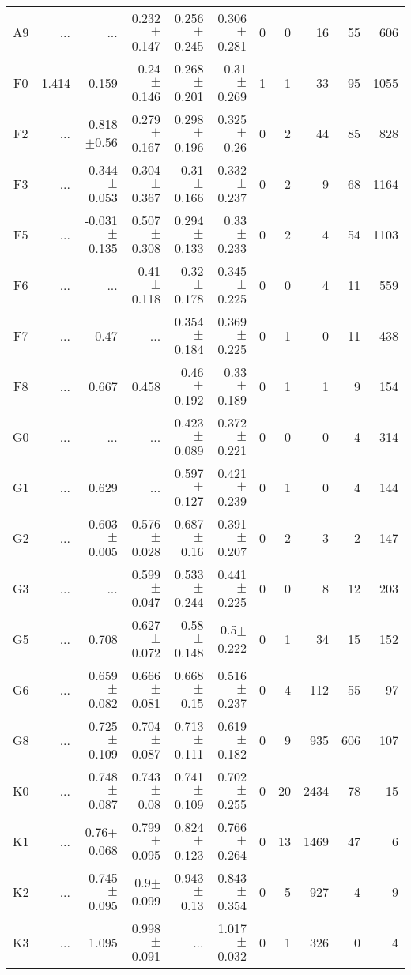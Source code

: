 \begin{table}[t]
\begin{table}[t]
\begin{center}
\begin{tabular}{c|rrrrr|rrrrr}
    A9	&	 ...	&	 ...	&	0.232$\pm$0.147	&	0.256$\pm$0.245	&	0.306$\pm$0.281	&	0	&	0	&	16	&	55	&	606	\\
    F0	&	1.414	&	0.159	&	0.24$\pm$0.146	&	0.268$\pm$0.201	&	0.31$\pm$0.269	&	1	&	1	&	33	&	95	&	1055	\\
    F2	&	 ...	&	0.818$\pm$0.56	&	0.279$\pm$0.167	&	0.298$\pm$0.196	&	0.325$\pm$0.26	&	0	&	2	&	44	&	85	&	828	\\
    F3	&	 ...	&	0.344$\pm$0.053	&	0.304$\pm$0.367	&	0.31$\pm$0.166	&	0.332$\pm$0.237	&	0	&	2	&	9	&	68	&	1164	\\
    F5	&	 ...	&	-0.031$\pm$0.135	&	0.507$\pm$0.308	&	0.294$\pm$0.133	&	0.33$\pm$0.233	&	0	&	2	&	4	&	54	&	1103	\\
    F6	&	 ...	&	 ...	&	0.41$\pm$0.118	&	0.32$\pm$0.178	&	0.345$\pm$0.225	&	0	&	0	&	4	&	11	&	559	\\
    F7	&	 ...	&	0.47	&	 ...	&	0.354$\pm$0.184	&	0.369$\pm$0.225	&	0	&	1	&	0	&	11	&	438	\\
    F8	&	 ...	&	0.667	&	0.458	&	0.46$\pm$0.192	&	0.33$\pm$0.189	&	0	&	1	&	1	&	9	&	154	\\
    G0	&	 ...	&	 ...	&	 ...	&	0.423$\pm$0.089	&	0.372$\pm$0.221	&	0	&	0	&	0	&	4	&	314	\\
    G1	&	 ...	&	0.629	&	 ...	&	0.597$\pm$0.127	&	0.421$\pm$0.239	&	0	&	1	&	0	&	4	&	144	\\
    G2	&	 ...	&	0.603$\pm$0.005	&	0.576$\pm$0.028	&	0.687$\pm$0.16	&	0.391$\pm$0.207	&	0	&	2	&	3	&	2	&	147	\\
    G3	&	 ...	&	 ...	&	0.599$\pm$0.047	&	0.533$\pm$0.244	&	0.441$\pm$0.225	&	0	&	0	&	8	&	12	&	203	\\
    G5	&	 ...	&	0.708	&	0.627$\pm$0.072	&	0.58$\pm$0.148	&	0.5$\pm$0.222	&	0	&	1	&	34	&	15	&	152	\\
    G6	&	 ...	&	0.659$\pm$0.082	&	0.666$\pm$0.081	&	0.668$\pm$0.15	&	0.516$\pm$0.237	&	0	&	4	&	112	&	55	&	97	\\
    G8	&	 ...	&	0.725$\pm$0.109	&	0.704$\pm$0.087	&	0.713$\pm$0.111	&	0.619$\pm$0.182	&	0	&	9	&	935	&	606	&	107	\\
    K0	&	 ...	&	0.748$\pm$0.087	&	0.743$\pm$0.08	&	0.741$\pm$0.109	&	0.702$\pm$0.255	&	0	&	20	&	2434	&	78	&	15	\\
    K1	&	 ...	&	0.76$\pm$0.068	&	0.799$\pm$0.095	&	0.824$\pm$0.123	&	0.766$\pm$0.264	&	0	&	13	&	1469	&	47	&	6	\\
    K2	&	 ...	&	0.745$\pm$0.095	&	0.9$\pm$0.099	&	0.943$\pm$0.13	&	0.843$\pm$0.354	&	0	&	5	&	927	&	4	&	9	\\
    K3	&	 ...	&	1.095	&	0.998$\pm$0.091	&	 ...	&	1.017$\pm$0.032	&	0	&	1	&	326	&	0	&	4	\\

\end{tabular}
\end{center}
\end{table}
\end{table}

